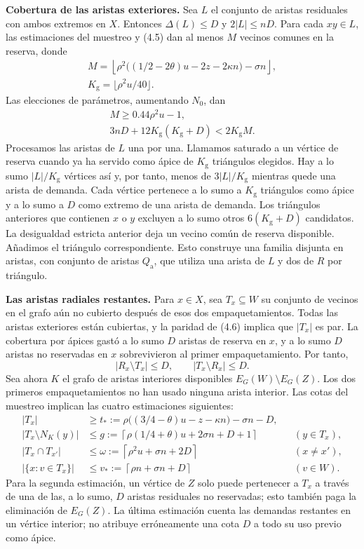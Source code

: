 \documentclass[spanish,11pt,a4paper]{article}
\begin{document}
\textbf{Cobertura de las aristas exteriores.} Sea \(L\) el conjunto de aristas residuales con ambos extremos en \(X\). Entonces \(\Delta(L)\le D\) y \(2|L|\le nD\). Para cada \(xy\in L\), las estimaciones del muestreo y (4.5) dan al menos \(M\) vecinos comunes en la reserva, donde \[\begin{gathered}
M=\left\lfloor
\rho^2\bigl((1/2-2\theta)u-2z-2\kappa n\bigr)-\sigma n
\right\rfloor,\\
K_{\mathrm g}=\lfloor\rho^2u/40\rfloor.
\end{gathered}\] Las elecciones de parámetros, aumentando \(N_0\), dan \[\begin{gathered}
M\ge0.44\rho^2u-1,\\
3nD+12K_{\mathrm g}(K_{\mathrm g}+D)<2K_{\mathrm g}M.
\end{gathered}\] Procesamos las aristas de \(L\) una por una. Llamamos saturado a un vértice de reserva cuando ya ha servido como ápice de \(K_{\mathrm g}\) triángulos elegidos. Hay a lo sumo \(|L|/K_{\mathrm g}\) vértices así y, por tanto, menos de \(3|L|/K_{\mathrm g}\) mientras quede una arista de demanda. Cada vértice pertenece a lo sumo a \(K_{\mathrm g}\) triángulos como ápice y a lo sumo a \(D\) como extremo de una arista de demanda. Los triángulos anteriores que contienen \(x\) o \(y\) excluyen a lo sumo otros \(6(K_{\mathrm g}+D)\) candidatos. La desigualdad estricta anterior deja un vecino común de reserva disponible. Añadimos el triángulo correspondiente. Esto construye una familia disjunta en aristas, con conjunto de aristas \(Q_{\mathrm a}\), que utiliza una arista de \(L\) y dos de \(R\) por triángulo.

\textbf{Las aristas radiales restantes.} Para \(x\in X\), sea \(T_x\subseteq W\) su conjunto de vecinos en el grafo aún no cubierto después de esos dos empaquetamientos. Todas las aristas exteriores están cubiertas, y la paridad de (4.6) implica que \(|T_x|\) es par. La cobertura por ápices gastó a lo sumo \(D\) aristas de reserva en \(x\), y a lo sumo \(D\) aristas no reservadas en \(x\) sobrevivieron al primer empaquetamiento. Por tanto, \[|R_x\setminus T_x|\le D,\qquad |T_x\setminus R_x|\le D.\] Sea ahora \(K\) el grafo de aristas interiores disponibles \(E_G(W)\setminus E_G(Z)\). Los dos primeros empaquetamientos no han usado ninguna arista interior. Las cotas del muestreo implican las cuatro estimaciones siguientes: \[\begin{aligned}
|T_x|&\ge t_*:=\rho\bigl((3/4-\theta)u-z-\kappa n\bigr)-\sigma n-D,\\
|T_x\setminus N_K(y)|&\le
g:=\left\lceil\rho(1/4+\theta)u+2\sigma n+D+1\right\rceil
&& (y\in T_x),\\
|T_x\cap T_{x'}|&\le
\omega:=\left\lceil\rho^2u+\sigma n+2D\right\rceil
&& (x\ne x'),\\
|\{x:v\in T_x\}|&\le
v_*:=\left\lceil\rho n+\sigma n+D\right\rceil
&& (v\in W).
\end{aligned}\] Para la segunda estimación, un vértice de \(Z\) solo puede pertenecer a \(T_x\) a través de una de las, a lo sumo, \(D\) aristas residuales no reservadas; esto también paga la eliminación de \(E_G(Z)\). La última estimación cuenta las demandas restantes en un vértice interior; no atribuye erróneamente una cota \(D\) a todo su uso previo como ápice.
\end{document}
